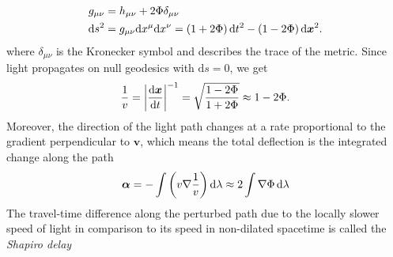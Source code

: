 %
\begin{equation}\eqlbl{metric}%
  \begin{aligned}%
    g_{\mu\nu} &= h_{\mu\nu} + 2\Phi\delta_{\mu\nu} \\
    \mathrm{d}s^{2} &= g_{\mu\nu}\mathrm{d}x^{\mu}\mathrm{d}x^{\nu}
     = \left(1+2\Phi\right) \mathrm{d}t^{2} 
     - \left(1-2\Phi\right) \mathrm{d}\bm x^{2}.
  \end{aligned}%
\end{equation}%
%
where $\delta_{\mu\nu}$ is the Kronecker symbol and describes the trace of the
metric.  Since light propagates on null geodesics with $\mathrm{d}s = 0$, we get
%
%
\begin{equation}\eqlbl{refraction_index}%
  \frac{1}{v} = \left|\frac{\mathrm{d}\bm x}{\mathrm{d}t}\right|^{-1}
  = \sqrt{\frac{1 - 2\Phi}{1 + 2\Phi}} \approx 1 - 2\Phi.
\end{equation}%
%
Moreover, the direction of the light path changes at a rate proportional to the
gradient perpendicular to $\bm v$, which means the total deflection is the
integrated change along the path  
%
%
\begin{equation}\eqlbl{deflections}%
  \bm\alpha = - \int \left(v \nabla\frac{1}{v}\right)\mathrm{d}\lambda 
   \approx 2 \int\nabla\Phi\,\mathrm{d}\lambda
\end{equation}%
%
The travel-time difference along the perturbed path due to the locally slower
speed of light in comparison to its speed in non-dilated spacetime is called the
\textit{Shapiro delay} 
